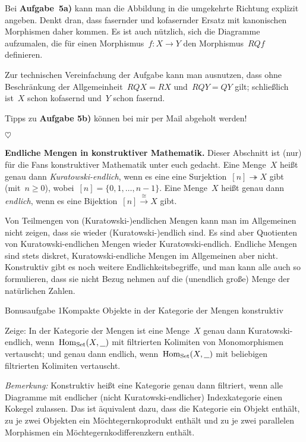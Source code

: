 \documentclass{uebblatt}
\newcommand{\stopper}{\begin{center}$\heartsuit$\end{center}}
\begin{document}
Bei \textbf{Aufgabe~5a)} kann man die Abbildung in die umgekehrte Richtung
explizit angeben. Denkt dran, dass fasernder und kofasernder Ersatz mit
kanonischen Morphismen daher kommen. Es ist auch nützlich, sich die Diagramme
aufzumalen, die für einen Morphismus~$f : X \to Y$ den Morphismus~$RQf$
definieren.

Zur technischen Vereinfachung der Aufgabe kann man ausnutzen, dass ohne
Beschränkung der Allgemeinheit~$RQX = RX$ und~$RQY = QY$ gilt; schließlich ist~$X$
schon kofasernd und~$Y$ schon fasernd.

Tipps zu \textbf{Aufgabe 5b)} können bei mir per Mail abgeholt werden!

\stopper

\textbf{Endliche Mengen in konstruktiver Mathematik.} Dieser Abschnitt ist
(nur) für die Fans konstruktiver Mathematik unter euch gedacht.
Eine Menge~$X$ heißt genau dann \emph{Kuratowski-endlich}, wenn es eine
eine Surjektion~$[n] \twoheadrightarrow X$ gibt (mit~$n \geq 0$), wobei~$[n] =
\{0,1,\ldots,n-1\}$. Eine Menge~$X$ heißt genau dann \emph{endlich}, wenn es
eine Bijektion~$[n] \stackrel{\cong}{\to} X$ gibt.

Von Teilmengen von (Kuratowski-)endlichen Mengen kann man im Allgemeinen nicht
zeigen, dass sie wieder (Kuratowski-)endlich sind. Es sind aber Quotienten von
Kuratowski-endlichen Mengen wieder Kuratowski-endlich. Endliche Mengen sind
stets diskret, Kura\-towski-endliche Mengen im Allgemeinen aber nicht.
Konstruktiv gibt es noch weitere Endlichkeitsbegriffe, und man kann alle auch
so formulieren, dass sie nicht Bezug nehmen auf die (unendlich große) Menge der
natürlichen Zahlen.

\begin{aufgabe*}{Bonusaufgabe 1}{Kompakte Objekte in der Kategorie der Mengen konstruktiv}

Zeige: In der Kategorie der Mengen ist eine Menge~$X$ genau dann
Kuratowski-endlich, wenn~$\mathrm{Hom}_{\mathrm{Set}}(X,\underline{\ \ })$ mit filtrierten
Kolimiten von Monomorphismen vertauscht; und genau dann endlich,
wenn~$\mathrm{Hom}_{\mathrm{Set}}(X,\underline{\ \ })$ mit beliebigen filtrierten Kolimiten
vertauscht.

\emph{Bemerkung:} Konstruktiv heißt eine Kategorie genau dann filtriert, wenn
alle Diagramme mit endlicher (nicht Kuratowski-endlicher) Indexkategorie einen
Kokegel zulassen. Das ist äquivalent dazu, dass die Kategorie ein Objekt
enthält, zu je zwei Objekten ein Möchtegernkoprodukt enthält und zu je zwei
parallelen Morphismen ein Möch\-te\-gern\-ko\-dif\-fe\-renz\-kern enthält.
\end{aufgabe*}
\vspace{-1em}
\end{document}
